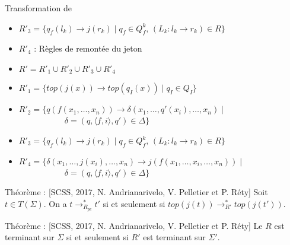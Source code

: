 \begin{frame}{Transformation de \pctrs}
\begin{overprint}
\begin{itemize}
    \item $R'_3 = \{q_f(l_k) \rightarrow j(r_k) \mid q_f \in Q_f^k,\, (L_k : l_k \rightarrow r_k) \in R\}$
    \item $R'_4$ : Règles de remontée du jeton
    \end{itemize}
    \begin{itemize}
    \item $R' = R'_1 \cup R'_2 \cup R'_3 \cup R'_4$
    \item $R'_1 = \{top(j(x)) \rightarrow top(q_I(x)) \mid q_I \in Q_I\}$
    \item $R'_2 = \{q(f(x_1,\ldots,x_n))\rightarrow \delta(x_1,\ldots,q'(x_i),\ldots,x_n) \mid$\\
      ~~~~~~~~~~~$\delta=(q, \langle f,i \rangle, q') \in \Delta\}$
    \item $R'_3 = \{q_f(l_k) \rightarrow j(r_k) \mid q_f \in Q_f^k,\, (L_k : l_k \rightarrow r_k) \in R\}$
    \item $R'_4 = \{\delta(x_1,\ldots,j(x_i),\ldots,x_n)\rightarrow j(f(x_1,\ldots,x_i,\ldots,x_n)) \mid$\\
      ~~~~~~~~~~~$\delta=(q, \langle f,i \rangle, q') \in \Delta\}$
    \end{itemize}
  \end{overprint}
  \begin{alertblock}{Théorème : {\small[SCSS, 2017, N. Andrianarivelo, V. Pelletier et P. Réty]}}
    Soit $t \in T(\Sigma)$. On a $t \rightarrow^*_{R_{pc}} t'$ si et seulement si $top(j(t)) \rightarrow^*_{R'} top(j(t'))$.
  \end{alertblock}
  \begin{alertblock}{Théorème : {\small[SCSS, 2017, N. Andrianarivelo, V. Pelletier et P. Réty]}}
    Le \pctrs $R$ est terminant sur $\Sigma$ si et seulement si $R'$ est terminant sur $\Sigma'$.
  \end{alertblock}
\end{frame}

